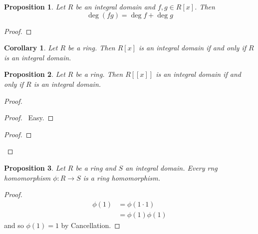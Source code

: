 \documentclass{book}
\let\qed\relax
\newtheorem{prop}{Proposition}[chapter]
\newtheorem{cor}{Corollary}[prop]
\theoremstyle{definition}
\begin{document}
\begin{prop}
Let $R$ be an integral domain and $f,g \in R[x]$. Then
\[ \deg(fg) = \deg f + \deg g \]
\end{prop}

\begin{proof}
\pf
{}
\qed
\end{proof}

\begin{cor}
Let $R$ be a ring. Then $R[x]$ is an integral domain if and only if $R$ is an integral domain.
\end{cor}

\begin{prop}
Let $R$ be a ring. Then $R[[x]]$ is an integral domain if and only if $R$ is an integral domain.
\end{prop}

\begin{proof}
\pf
{}
\begin{proof}
	\pf\ Easy.
\end{proof}
\begin{proof}
\end{proof}
\qed
\end{proof}

\begin{prop}
Let $R$ be a ring and $S$ an integral domain. Every rng homomorphism $\phi : R \rightarrow S$ is a ring homomorphism.
\end{prop}

\begin{proof}
\pf
\begin{align*}
\phi(1) & = \phi(1 \cdot 1) \\
& = \phi(1) \phi(1)
\end{align*}
and so $\phi(1) = 1$ by Cancellation. \qed
\end{proof}
\end{document}
